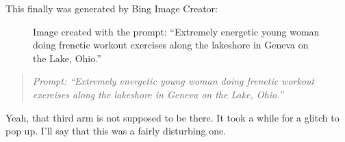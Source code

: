 This finally was generated by Bing Image Creator:

\begin{figure}
\centering
{}
\caption{Image created with the prompt: ``Extremely energetic young
woman doing frenetic workout exercises along the lakeshore in Geneva on
the Lake, Ohio.''}
\end{figure}

\begin{quote}
\emph{Prompt: ``Extremely energetic young woman doing frenetic workout
exercises along the lakeshore in Geneva on the Lake, Ohio.''}
\end{quote}

Yeah, that third arm is not supposed to be there. It took a while for a
glitch to pop up. I'll say that this was a fairly disturbing one.
